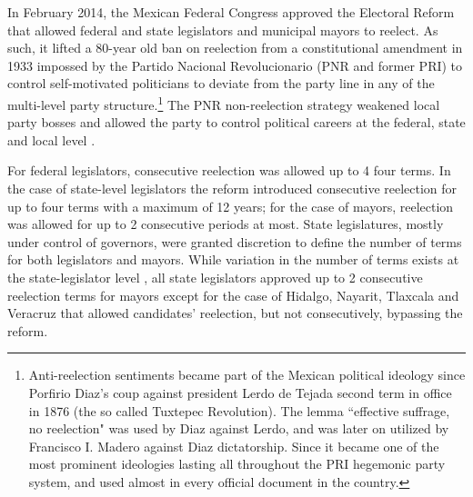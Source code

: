 \documentclass[12pt]{amsart}
\makeatletter
\def\subsection{\@startsection{subsection}{2}
	\z@{.8\linespacing\@plus.7\linespacing}{.7\linespacing}{\large}}
\numberwithin{equation}{section}
\theoremstyle{definition}
\theoremstyle{definition}
\theoremstyle{definition}
\makeatother
\begin{document}

\subsection{Term Limit Reform of 2014 \label{sec:reform}}   
       
In February 2014, the Mexican Federal Congress approved the Electoral Reform that allowed federal and state legislators and municipal mayors to reelect. As such, it lifted a 80-year old ban on reelection from a constitutional amendment in 1933 impossed by the Partido Nacional Revolucionario (PNR and former PRI) to control self-motivated politicians to deviate from the party line in any of the multi-level party structure.\footnote{Anti-reelection sentiments became part of the Mexican political ideology since Porfirio Diaz's coup against president Lerdo de Tejada second term in office in 1876 (the so called Tuxtepec Revolution). The lemma ``effective suffrage, no reelection" was used by Diaz against Lerdo, and was later on utilized by Francisco I. Madero against Diaz dictatorship. Since it became one of the most prominent ideologies lasting all throughout the PRI hegemonic party system, and used almost in every official document in the country.} The PNR non-reelection strategy weakened local party bosses and allowed the party to control political careers at the federal, state and local level \citep{weldon_2003}. 

For federal legislators, consecutive reelection was allowed up to 4 four terms. In the case of state-level legislators the reform introduced consecutive reelection for up to four terms with a maximum of 12 years; for the case of mayors, reelection was allowed for up to 2 consecutive periods at most. State legislatures, mostly under control of governors, were granted discretion to define the number of terms for both legislators and mayors. While variation in the number of terms exists at the state-legislator level \citep{motolinia_2020}, all state legislators approved up to 2 consecutive reelection terms for mayors except for the case of Hidalgo, Nayarit, Tlaxcala and Veracruz that allowed candidates' reelection, but not consecutively, bypassing the reform.  
\end{document}
